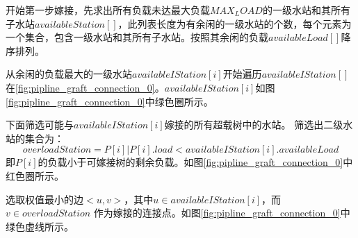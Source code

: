 \documentclass{cumcmthesis}
\begin{document}
  开始第一步嫁接，先求出所有负载未达最大负载$MAX_LOAD$的一级水站和其所有子水站$availableStation[]$，此列表长度为有余闲的一级水站的个数，每个元素为一个集合，包含一级水站和其所有子水站。按照其余闲的负载$availableLoad[]$降序排列。
  
  从余闲的负载最大的一级水站$availableIStation[i]$开始遍历$availableIStation[]$在\cref{fig:pipline_graft_connection_0}。$availableIStation[i]$如图\cref{fig:pipline_graft_connection_0}中绿色圈所示。
  
  下面筛选可能与$availableIStation[i]$嫁接的所有超载树中的水站。
  筛选出二级水站的集合为：
  $$overloadStation={P[i] |P[i].load < availableIStation[i].availableLoad }$$
  即$P[i]$的负载小于可嫁接树的剩余负载。如图\cref{fig:pipline_graft_connection_0}中红色圈所示。

  选取权值最小的边$<u, v>$，其中$u \in availableIStation[i]$，而$v \in overloadStation$
  作为嫁接的连接点。如图\cref{fig:pipline_graft_connection_0}中绿色虚线所示。
\end{document}
